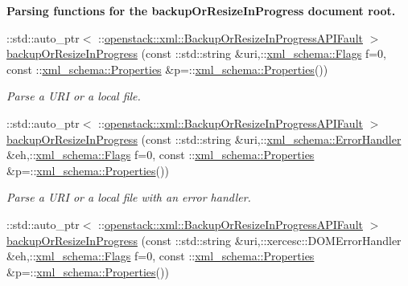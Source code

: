 \begin{Indent}{\bf Parsing functions for the backupOrResizeInProgress document root.}\par
\begin{DoxyCompactItemize}
\item 
::std::auto\_\-ptr$<$ ::\hyperlink{classopenstack_1_1xml_1_1BackupOrResizeInProgressAPIFault}{openstack::xml::BackupOrResizeInProgressAPIFault} $>$ \hyperlink{namespaceopenstack_1_1xml_ae5872739962f06a802746f018f85308e}{backupOrResizeInProgress} (const ::std::string \&uri,::\hyperlink{namespacexml__schema_affb4c227cbd9aa7453dd1dc5a1401943}{xml\_\-schema::Flags} f=0, const ::\hyperlink{namespacexml__schema_ad27ce19a7ee1d3b1064092648898f64c}{xml\_\-schema::Properties} \&p=::\hyperlink{namespacexml__schema_ad27ce19a7ee1d3b1064092648898f64c}{xml\_\-schema::Properties}())
\begin{DoxyCompactList}\small\item\em Parse a URI or a local file. \item\end{DoxyCompactList}\item 
::std::auto\_\-ptr$<$ ::\hyperlink{classopenstack_1_1xml_1_1BackupOrResizeInProgressAPIFault}{openstack::xml::BackupOrResizeInProgressAPIFault} $>$ \hyperlink{namespaceopenstack_1_1xml_abf5f005bcfd382aecd6d20a020b93fb0}{backupOrResizeInProgress} (const ::std::string \&uri,::\hyperlink{namespacexml__schema_ab1c9361bfd3b404eaabf0c31eded79dc}{xml\_\-schema::ErrorHandler} \&eh,::\hyperlink{namespacexml__schema_affb4c227cbd9aa7453dd1dc5a1401943}{xml\_\-schema::Flags} f=0, const ::\hyperlink{namespacexml__schema_ad27ce19a7ee1d3b1064092648898f64c}{xml\_\-schema::Properties} \&p=::\hyperlink{namespacexml__schema_ad27ce19a7ee1d3b1064092648898f64c}{xml\_\-schema::Properties}())
\begin{DoxyCompactList}\small\item\em Parse a URI or a local file with an error handler. \item\end{DoxyCompactList}\item 
::std::auto\_\-ptr$<$ ::\hyperlink{classopenstack_1_1xml_1_1BackupOrResizeInProgressAPIFault}{openstack::xml::BackupOrResizeInProgressAPIFault} $>$ \hyperlink{namespaceopenstack_1_1xml_a63905269555aa0182be6d19be45a4e20}{backupOrResizeInProgress} (const ::std::string \&uri,::xercesc::DOMErrorHandler \&eh,::\hyperlink{namespacexml__schema_affb4c227cbd9aa7453dd1dc5a1401943}{xml\_\-schema::Flags} f=0, const ::\hyperlink{namespacexml__schema_ad27ce19a7ee1d3b1064092648898f64c}{xml\_\-schema::Properties} \&p=::\hyperlink{namespacexml__schema_ad27ce19a7ee1d3b1064092648898f64c}{xml\_\-schema::Properties}())

\end{DoxyCompactItemize}
\end{Indent}
